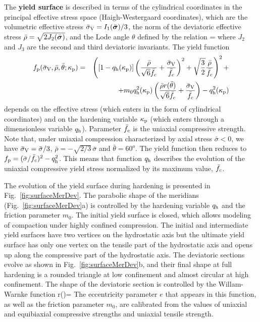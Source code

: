 \documentclass[a4paper]{article}
\newcommand{\mbf}[1]{\mbox{\boldmath$#1$}}
\newcommand{\bea}{\begin{eqnarray}}
\newcommand{\eea}{\end{eqnarray}}
\newcommand{\vsig}{\mbf{\sigma}}%
\begin{document}
The {\bf yield surface} is described in terms of the cylindrical coordinates in the principal effective stress space (Haigh-Westergaard coordinates), which are the volumetric effective stress $\bar{\sigma}_{\rm V} = {I_1(\bar{\vsig})}/{3}$, the norm of the deviatoric effective stress
$\bar{\rho} = \sqrt{2 J_2(\bar{\vsig})}$, 
and the Lode angle $\theta$ defined by the relation
\beq\label{lodeangle}
 \theta = 
\eeq
where $J_2$ and $J_3$ are the second and third deviatoric invariants.
The yield function
\bea\nonumber
f_{\rm p}(\bar\sigma_{\rm V},\bar\rho,\bar\theta;\kappa_{\rm p})&=&\left(\left[1-q_{\rm{h}}(\kappa_{\rm p})\right]\left( \frac{\bar{\rho}} {\sqrt{6}\fc} + \frac{\bar{\sigma}_{\rm V}} {\fc} \right)^2 + \sqrt{\frac{3}{2}} \frac {\bar{\rho}}{\fc} \right)^2 +\\
&& 
 +m_0 q_{\rm{h}}^2(\kappa_{\rm p}) \left(\frac{\bar{\rho}r(\bar{\theta}) }{\sqrt{6}\fc} + \frac{\bar{\sigma}_{\rm V}}{\fc} \right) - q_{\rm{h}}^2(\kappa_{\rm p})
\label{eq:yieldSurface}
\eea
depends on the effective stress (which enters in the form of cylindrical coordinates) and on the hardening variable $\kappa_{\rm p}$ (which enters through a dimensionless variable $q_{\rm h}$). Parameter $\bar{f}_c$ is the uniaxial compressive strength. 
Note that, under uniaxial compression characterized by axial stress 
$\bar\sigma<0$,  we have $\bar\sigma_{\rm V}=\bar\sigma/3$,
$\bar\rho=-\sqrt{2/3}\,\bar\sigma$ and $\bar\theta=60^o$. The yield function
then reduces to $f_{\rm p}=(\bar\sigma/\bar{f}_c)^2-q_{\rm{h}}^2$. This means that
function $q_{\rm{h}}$ describes the evolution of the uniaxial compressive
yield stress normalized by its maximum value, $\bar{f}_c$.

The evolution of the yield surface during hardening is presented in Fig.~\ref{fig:surfaceMerDev}.
The parabolic shape of the meridians (Fig.~\ref{fig:surfaceMerDev}a) is controlled by the hardening variable $q_{\rm h}$ and the friction parameter $m_0$.
The initial yield surface is closed, which allows modeling of compaction under highly confined compression. The initial and intermediate 
yield surfaces have two vertices on the hydrostatic axis but the ultimate yield surface has only one vertex 
on the tensile part of the hydrostatic axis and opens up along the compressive
part of the hydrostatic axis.
The deviatoric sections evolve as shown in Fig.~\ref{fig:surfaceMerDev}b,
and their final shape at full hardening
is a rounded triangle at low confinement and almost circular 
at high confinement.
The shape of the deviatoric section is controlled by the Willam-Warnke 
function 
\beq\label{bf103}
r(\theta)=
\eeq
The eccentricity parameter $e$ that appears in this function, as well as the friction parameter $m_0$, are calibrated from the values of uniaxial and equibiaxial compressive strengths and uniaxial tensile strength.
\end{document}

